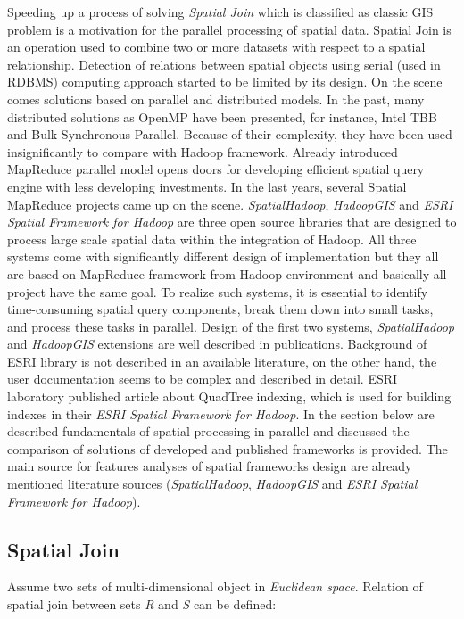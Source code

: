 \documentclass[a4paper,12pt,oneside]{report}
\begin{document}
	Speeding up a process of solving \textit{Spatial Join} which is classified as
	classic GIS 
	problem is a motivation for the parallel processing of spatial data. Spatial
	Join 
	is an operation used to combine two or more datasets with respect to a spatial 
	relationship. Detection of relations between spatial objects using serial (used
	in RDBMS) 
	computing approach started to be limited by its design. On the scene comes
	solutions
	based on parallel and distributed models. In the past, many distributed 
	solutions as OpenMP\cite{omp} have been presented, for instance, Intel TBB and
	Bulk Synchronous Parallel\cite{multi_cpu}.
	Because of their complexity, they have been used insignificantly to compare with
	Hadoop framework.
	Already introduced MapReduce parallel model opens doors for developing efficient
	spatial query engine with less developing investments. In the last years,
	several Spatial MapReduce projects came up on the scene.
	\textit{SpatialHadoop}\cite{spatialhadoop}, \textit{HadoopGIS}\cite{hadoopGIS}
	and \textit{ESRI Spatial Framework for Hadoop}\cite{ESRI_framework}
	are three open source libraries that are designed to process large scale spatial
	data within the integration of Hadoop.
	All three systems come with significantly different design of implementation but
	they all are based
	on MapReduce framework from Hadoop environment and basically all project have
	the same goal.
	To realize such systems, it is essential to identify time-consuming spatial
	query components,
	break them down into small tasks, and process these tasks in parallel. 
	Design of the first two systems, \textit{SpatialHadoop} and \textit{HadoopGIS}
	extensions are well described in publications. Back\-ground of ESRI library is not
	described in an available
	literature, on the other hand, the user documentation seems to be complex and
	described in detail. 
	ESRI laboratory published article\cite{ESRI_indexing} about QuadTree indexing,
	which is used for building 
	indexes in their \textit{ESRI Spatial Framework for Hadoop}.
	In the section below are described fundamentals of spatial processing in
	parallel and  discussed 
	the comparison of solutions of developed and published frameworks is provided.
	The main source for features analyses of spatial frameworks design are already
	mentioned literature sources (\textit{SpatialHadoop}\cite{spatialhadoop},
	\textit{HadoopGIS}\cite{hadoopGIS} 
	and \textit{ESRI Spatial Framework for Hadoop}\cite{ESRI_framework}).
	
	
	\subsection{Spatial Join}
	\label{sub:spatial_join}
	Assume two sets of multi-dimensional object in \emph{Euclidean space}. 
	Relation of spatial join between sets \emph{R} and \emph{S} can be defined\cite{spatial_join2}:
	
\end{document}
